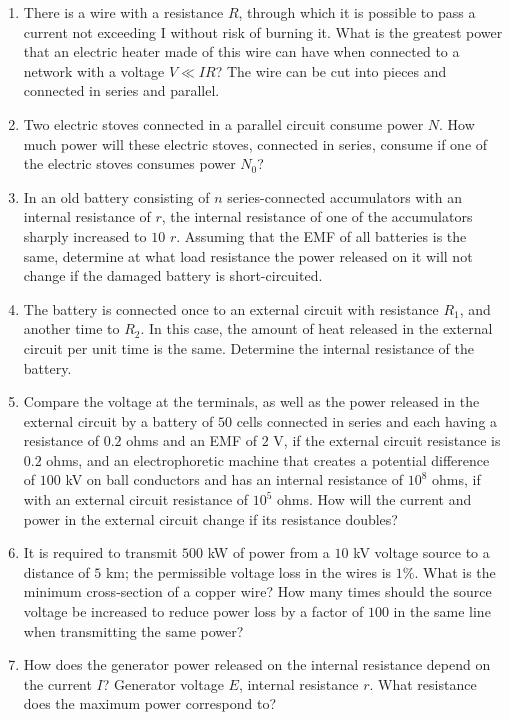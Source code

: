 \documentclass{article}
\begin{document}
\begin{enumerate}[label=8.3.\arabic*]
\item There is a wire with a resistance $R$, through which it is possible to pass a current not exceeding I without risk of burning it. What is the greatest power that an electric heater made of this wire can have when connected to a network with a voltage $V \ll IR$? The wire can be cut into pieces and connected in series and parallel.

\item Two electric stoves connected in a parallel circuit consume power $N$. How much power will these electric stoves, connected in series, consume if one of the electric stoves consumes power $N_0$?

\item In an old battery consisting of $n$ series-connected accumulators with an internal resistance of $r$, the internal resistance of one of the accumulators sharply increased to $10$ $r$. Assuming that the EMF of all batteries is the same, determine at what load resistance the power released on it will not change if the damaged battery is short-circuited.

\item The battery is connected once to an external circuit with resistance $R_1$, and another time to $R_2$. In this case, the amount of heat released in the external circuit per unit time is the same. Determine the internal resistance of the battery.

\item Compare the voltage at the terminals, as well as the power released in the external circuit by a battery of $50$ cells connected in series and each having a resistance of $0.2$ ohms and an EMF of $2$ V, if the external circuit resistance is $0.2$ ohms, and an electrophoretic machine that creates a potential difference of $100$ kV on ball conductors and has an internal resistance of $10^8$ ohms, if with an external circuit resistance of $10^5$ ohms. How will the current and power in the external circuit change if its resistance doubles?

\item It is required to transmit $500$ kW of power from a $10$ kV voltage source to a distance of $5$ km; the permissible voltage loss in the wires is $1 \%$. What is the minimum cross-section of a copper wire? How many times should the source voltage be increased to reduce power loss by a factor of $100$ in the same line when transmitting the same power?

\item How does the generator power released on the internal resistance depend on the current $I$? Generator voltage $E$, internal resistance $r$. What resistance does the maximum power correspond to?


\end{enumerate}
\end{document}

